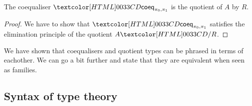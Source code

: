 \begin{proposition}
  The coequaliser $\coeqty{\pi_0}{\pi_1}$ is the quotient of $A$ by
  $R$.
\end{proposition}

\begin{proof}
  We have to show that $\coeqty{\pi_0}{\pi_1}$ satisfies the
  elimination principle of the quotient $\quotty{A}{R}$.
\end{proof}

We have shown that coequalisers and quotient types can be phrased in
terms of eachother. We can go a bit further and state that they are
equivalent when seen as families.

\subsection{Syntax of type theory}

\begin{sorts}
  \sortnamety{\ttconty}{\Set} \\
  \sortnamety{\tttyty}{\ttconty \to \Set}
\end{sorts}

\begin{datatype}{\ttconty}{}
  \constr{\ttnil}{\ttconty} \\
  \constr{\ttcons{\_}{\_}}{(\Gamma : \ttconty) \to \tttyty\ \Gamma \to \ttconty}
\end{datatype}


\begin{datatype}{\tttyty}{}
  \constr{\ttzero}{(\Gamma : \ttconty) \to \tttyty\ \Gamma} \\
  \constr{\ttone}{(\Gamma : \ttconty) \to \tttyty\ \Gamma} \\
\end{datatype}

\begin{sorts}
  \sortnamety{\tttmty}{(\Gamma : \ttconty) \to \tttyty\ \Gamma \to \Set}
\end{sorts}

\begin{datatype}{\tttmty}{}
   \\
   \\
\end{datatype}

